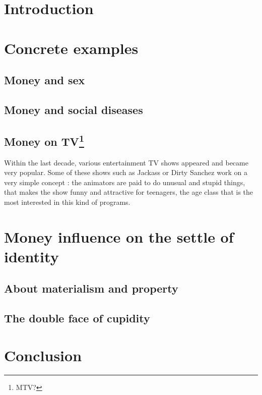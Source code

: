 \section{Introduction}



\section{Concrete examples}

\subsection{Money and sex}



\subsection{Money and social diseases}



\subsection[Money on TV]{Money on TV\footnote{MTV?}}

Within the last decade, various entertainment TV shows appeared and became very popular. Some of these shows such as Jackass 
or Dirty Sanchez work on a very simple concept : the animators are paid to do unusual and stupid things, that makes the show 
funny and attractive for teenagers, the age class that is the most interested in this kind of programs.

\section{Money influence on the settle of identity}

\subsection{About materialism and property}



\subsection{The double face of cupidity}



\section{Conclusion}


